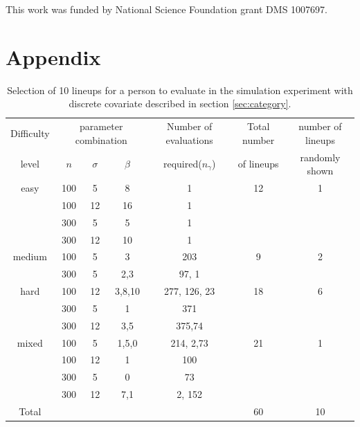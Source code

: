 \documentclass{article}
\begin{document}
This work was funded by National Science Foundation grant DMS 1007697.

%
%

%


\section*{Appendix}

\begin{table}[hbtp]
\caption{Selection of 10 lineups for a person to evaluate in the simulation experiment with discrete covariate described in section \ref{sec:category}.} 
\centering
\begin{tabular}{c c c c  c c c}
\hline\hline
Difficulty& \multicolumn{3}{c}{parameter combination}& Number of evaluations &Total number  & number of lineups\\
level & $n$ & $\sigma$ & $\beta$ &required($n_{\gamma}$) & of lineups & randomly shown \\
\hline
easy&100& 5&8 & 1& 12 & 1\\
&100&12&16 &1&&\\
&300& 5&5 &1&&\\
&300&12&10 &1 &&\\
\hline
medium&100& 5&3 &203 & 9 &2\\
&300& 5&2,3 & 97, 1&&\\
\hline
hard&100&12&3,8,10 & 277, 126, 23& 18 &6\\
&300& 5&1 & 371 &&\\
&300&12&3,5& 375,74 &&\\
\hline
mixed&100& 5&1,5,0& 214, 2,73 & 21 &1\\
&100&12&1& 100& &\\
&300& 5&0 & 73&&\\
&300&12&7,1& 2, 152&&\\
\hline
Total &&&&&60&10\\
\hline
\end{tabular}
\label{tbl:dist_lineup1}
\end{table} 
\end{document}
